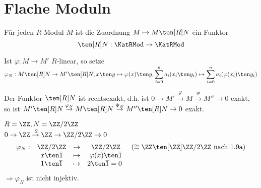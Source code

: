 \section{Flache Moduln}

\begin{Bem}
  Für jeden $R$-Modul $M$ ist die Zuordnung $M \mapsto M \ten[R] N$ ein Funktor
  \[
  \ten[R] N: \KatRMod \to \KatRMod
  \]
\end{Bem}

\begin{Bew} 
  Ist $\varphi: M \to M'$ $R$-linear, so setze $\varphi_N: M \ten[R] N \to M'
  \ten[R] N, x \ten y \mapsto \varphi(x) \ten y, \displaystyle
  \sum_{i=0}^na_i(x_i \ten y_i) \mapsto \sum_{i=0}^n a_i(\varphi(x_i) \ten y_i)$
\end{Bew}

\begin{Prop}
\label{1.12}
  Der Funktor $\ten[R] N$ ist rechtsexakt, d.h. ist $0 \to M'
  \overset{\varphi}{\to} M \overset{\Psi}{\to} M'' \to 0$ exakt, so ist $ M'
  \ten[R] N \overset{\varphi_N}{\to} M \ten[R] N \overset{\Psi_N}{\to} M'' \ten[R] N
  \to 0$ exakt.
\end{Prop}

\begin{nnBsp} 
  $R = \ZZ, N = \ZZ/2 \ZZ$\\
  $0 \to \ZZ \overset{ \cdot 2}{\to} \ZZ \to \ZZ/2
  \ZZ \to 0$
  \[
  \begin{matrix}
  \varphi_N:& \ZZ/2 \ZZ &\to& \ZZ / 2 \ZZ &(\cong \ZZ \ten[\ZZ] \ZZ / 2 \ZZ
  \text{ nach 1.9a})\\
  &x\ten\overline 1 & \mapsto & \varphi(x)\ten\overline 1&\\
  &1\ten\overline 1&\mapsto&2\ten\overline 1=0\
  \end{matrix}
  \]
  $\Rightarrow \varphi_N$ ist nicht injektiv.
\end{nnBsp}

